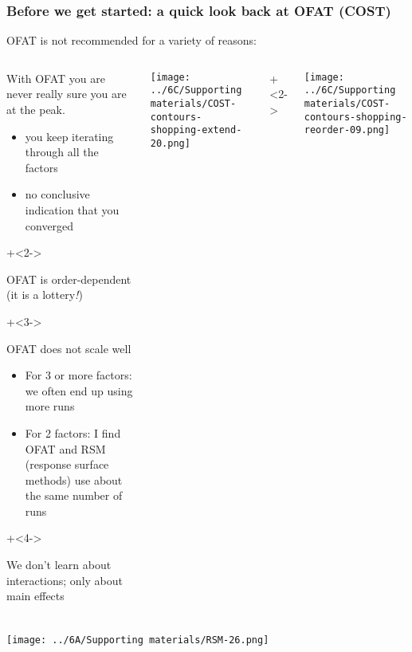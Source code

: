 \begin{frame}\frametitle{Before we get started: a quick look back at OFAT (COST)}
	
	OFAT is not recommended for a variety of reasons:
	\begin{columns}[T]
			\vspace{0.5cm}
			\begin{itemize}
				\item	With OFAT you are never really sure you are at the peak.
					\begin{itemize}
						\item	you keep iterating through all the factors
						\item	no conclusive indication that you converged
					\end{itemize}
				
		\onslide+<2->{
				\vspace{0.5cm}
				\item	OFAT is order-dependent (it is a lottery\emph{!})
		}
		\onslide+<3->{
				\vspace{0.5cm}
		
				\item	OFAT does not scale well 
					\begin{itemize}
						\item	For 3 or more factors: we often end up using more runs
						\item	For 2 factors: I find OFAT and RSM (response surface methods) use about the same number of
								runs
					\end{itemize}
		}
		\onslide+<4->{
				\vspace{0.5cm}
		
				\item	We don't learn about interactions; only about  main effects 
		}
			\end{itemize}
		
			\centerline{\texttt{[image: ../6C/Supporting materials/COST-contours-shopping-extend-20.png]}}
			\onslide+<2->{
				\centerline{\texttt{[image: ../6C/Supporting materials/COST-contours-shopping-reorder-09.png]}}
			}

	\end{columns}
	
	

\end{frame}
\begin{frame}\frametitle{}
	\centerline{\texttt{[image: ../6A/Supporting materials/RSM-26.png]}}
\end{frame}
